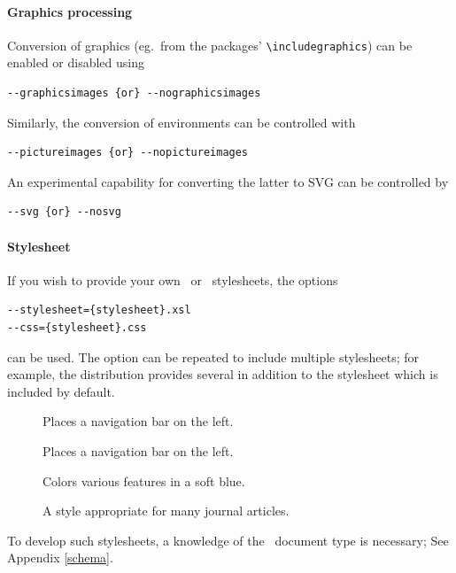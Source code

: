 \documentclass{book}
\begin{document}
\paragraph[Graphics]{Graphics processing}
Conversion of graphics (eg.~from the  packages' 
\verb|\includegraphics|) can be enabled or disabled
using
\begin{lstlisting}[style=shell]
--graphicsimages {or} --nographicsimages
\end{lstlisting}
Similarly, the conversion of  environments can be controlled with
\begin{lstlisting}[style=shell]
--pictureimages {or} --nopictureimages
\end{lstlisting}
An experimental capability for converting the latter to \textsc{SVG} can be
controlled by
\begin{lstlisting}[style=shell]
--svg {or} --nosvg
\end{lstlisting}

\paragraph{Stylesheet}
If you wish to provide your own \XSLT\  or
\CSS\ stylesheets, the options 
\begin{lstlisting}[style=shell]
--stylesheet={stylesheet}.xsl
--css={stylesheet}.css
\end{lstlisting}
 can be used.  The  option can be repeated to include multiple stylesheets;
for example, the distribution provides several in addition to the  stylesheet
which is included by default.
\begin{description}
\item[] Places a navigation bar on the left.
\item[] Places a navigation bar on the left.
\item[] Colors various features in a soft blue.
\item[] A style appropriate for many journal articles.
\end{description}

To develop such stylesheets, a knowledge
of the \LaTeXML\ document type is necessary; See Appendix \ref{schema}.

\end{document}
